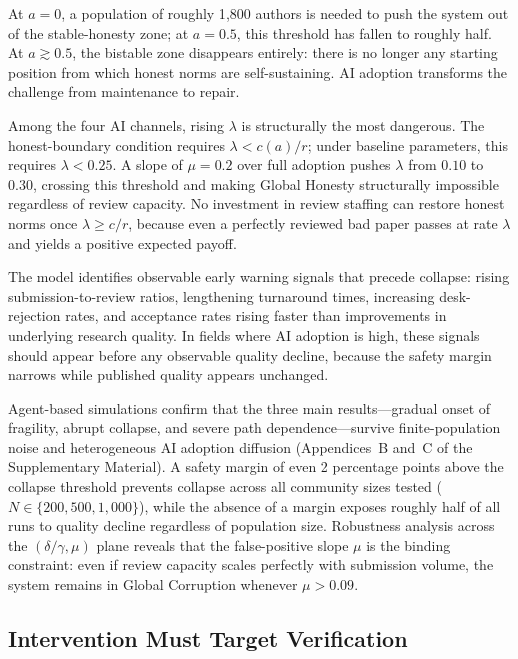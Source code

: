 \documentclass{article}
\begin{document}
At $a = 0$, a population of roughly 1{,}800 authors is needed to push the system out of the stable-honesty zone; at $a = 0.5$, this threshold has fallen to roughly half.
At $a \gtrsim 0.5$, the bistable zone disappears entirely: there is no longer any starting position from which honest norms are self-sustaining.
AI adoption transforms the challenge from maintenance to repair.

Among the four AI channels, rising $\lambda$ is structurally the most dangerous.
The honest-boundary condition requires $\lambda < c(a)/r$; under baseline parameters, this requires $\lambda < 0.25$.
A slope of $\mu = 0.2$ over full adoption pushes $\lambda$ from $0.10$ to $0.30$, crossing this threshold and making Global Honesty structurally impossible regardless of review capacity.
No investment in review staffing can restore honest norms once $\lambda \geq c/r$, because even a perfectly reviewed bad paper passes at rate $\lambda$ and yields a positive expected payoff.

The model identifies observable early warning signals that precede collapse: rising submission-to-review ratios, lengthening turnaround times, increasing desk-rejection rates, and acceptance rates rising faster than improvements in underlying research quality.
In fields where AI adoption is high, these signals should appear before any observable quality decline, because the safety margin narrows while published quality appears unchanged.

Agent-based simulations confirm that the three main results---gradual onset of fragility, abrupt collapse, and severe path dependence---survive finite-population noise and heterogeneous AI adoption diffusion (Appendices~B and~C of the Supplementary Material).
A safety margin of even 2 percentage points above the collapse threshold prevents collapse across all community sizes tested ($N \in \{200, 500, 1{,}000\}$), while the absence of a margin exposes roughly half of all runs to quality decline regardless of population size.
Robustness analysis across the $(\delta/\gamma, \mu)$ plane reveals that the false-positive slope $\mu$ is the binding constraint: even if review capacity scales perfectly with submission volume, the system remains in Global Corruption whenever $\mu > 0.09$.

\subsection{Intervention Must Target Verification}
\label{sec:interventions}
\end{document}
